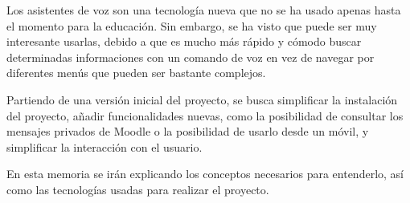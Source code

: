 
Los asistentes de voz son una tecnología nueva que no se ha usado apenas hasta el momento para la educación. Sin embargo, se ha visto que puede ser muy interesante usarlas, debido a que es mucho más rápido y cómodo buscar determinadas informaciones con un comando de voz en vez de navegar por diferentes menús que pueden ser bastante complejos.

Partiendo de una versión inicial del proyecto, se busca simplificar la instalación del proyecto, añadir funcionalidades nuevas, como la posibilidad de consultar los mensajes privados de Moodle o la posibilidad de usarlo desde un móvil, y simplificar la interacción con el usuario.

En esta memoria se irán explicando los conceptos necesarios para entenderlo, así como las tecnologías usadas para realizar el proyecto.

